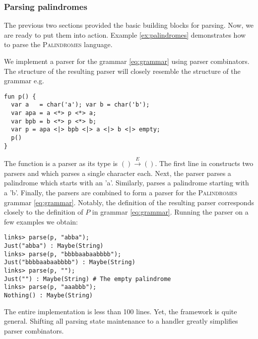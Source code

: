 \subsubsection{Parsing palindromes}
The previous two sections provided the basic building blocks for parsing. Now, we are ready to put them into action. Example \ref{ex:palindromes} demonstrates how to parse the {\scshape{Palindromes}} language.
\begin{example}\label{ex:palindromes}
We implement a parser for the grammar \eqref{eq:grammar} using parser combinators. The structure of the resulting parser will closely resemble the structure of the grammar e.g.
\begin{lstlisting}[style=links]
fun p() {
  var a   = char('a'); var b = char('b');
  var apa = a <*> p <*> a;
  var bpb = b <*> p <*> b;
  var p = apa <|> bpb <|> a <|> b <|> empty;
  p()
}
\end{lstlisting}
The function  is a parser as its type is $() \xrightarrow{E} ()$. The first line in  constructs two parsers  and  which parses a single character each. Next, the parser  parses a palindrome which starts with an 'a'. Similarly,  parses a palindrome starting with a 'b'.
Finally, the parsers are combined to form a parser for the {\scshape{Palindromes}} grammar \eqref{eq:grammar}.
Notably, the definition of the resulting parser  corresponds closely to the definition of $P$ in grammar \eqref{eq:grammar}.
Running the parser on a few examples we obtain:
\begin{lstlisting}[style=links]
links> parse(p, "abba");
Just("abba") : Maybe(String)
links> parse(p, "bbbbaabaabbbb");
Just("bbbbaabaabbbb") : Maybe(String)
links> parse(p, "");
Just("") : Maybe(String) # The empty palindrome
links> parse(p, "aaabbb");
Nothing() : Maybe(String)
\end{lstlisting}
\end{example}

The entire implementation is less than 100 lines. Yet, the framework is quite general. Shifting all parsing state maintenance to a handler greatly simplifies parser combinators. 